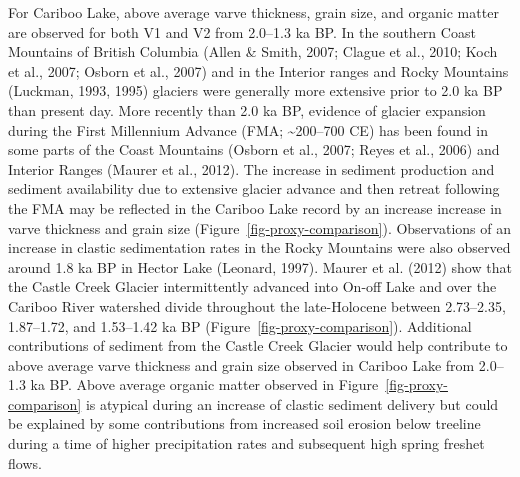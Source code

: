 \documentclass[
  letterpaper,
  DIV=11,
  numbers=noendperiod]{scrartcl}
\begin{document}
For Cariboo Lake, above average varve thickness, grain size, and organic
matter are observed for both V1 and V2 from 2.0--1.3 ka BP. In the
southern Coast Mountains of British Columbia (Allen \& Smith, 2007;
Clague et al., 2010; Koch et al., 2007; Osborn et al., 2007) and in the
Interior ranges and Rocky Mountains (Luckman, 1993, 1995) glaciers were
generally more extensive prior to 2.0 ka BP than present day. More
recently than 2.0 ka BP, evidence of glacier expansion during the First
Millennium Advance (FMA; \textasciitilde200--700 CE) has been found in
some parts of the Coast Mountains (Osborn et al., 2007; Reyes et al.,
2006) and Interior Ranges (Maurer et al., 2012). The increase in
sediment production and sediment availability due to extensive glacier
advance and then retreat following the FMA may be reflected in the
Cariboo Lake record by an increase increase in varve thickness and grain
size (Figure~\ref{fig-proxy-comparison}). Observations of an increase in
clastic sedimentation rates in the Rocky Mountains were also observed
around 1.8 ka BP in Hector Lake (Leonard, 1997). Maurer et al. (2012)
show that the Castle Creek Glacier intermittently advanced into On-off
Lake and over the Cariboo River watershed divide throughout the
late-Holocene between 2.73--2.35, 1.87--1.72, and 1.53--1.42 ka BP
(Figure~\ref{fig-proxy-comparison}). Additional contributions of
sediment from the Castle Creek Glacier would help contribute to above
average varve thickness and grain size observed in Cariboo Lake from
2.0--1.3 ka BP. Above average organic matter observed in
Figure~\ref{fig-proxy-comparison} is atypical during an increase of
clastic sediment delivery but could be explained by some contributions
from increased soil erosion below treeline during a time of higher
precipitation rates and subsequent high spring freshet flows.
\end{document}
